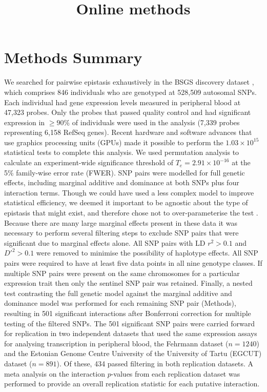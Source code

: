 \documentclass{article}
\title{Online methods}
\date{}
\author{}
\begin{document}
\maketitle


\tableofcontents

\section{Methods Summary}
We searched for pairwise epistasis exhaustively in the BSGS discovery dataset \cite{Powell2012}, which comprises 846 individuals who are genotyped at 528,509 autosomal SNPs. Each individual had gene expression levels measured in peripheral blood at 47,323 probes. Only the probes that passed quality control and had significant expression in $\geq 90\%$ of individuals were used in the analysis (7,339 probes representing 6,158 RefSeq genes). Recent hardware and software \cite{Hemani2011} advances that use graphics processing units (GPUs) made it possible to perform the $1.03 \times 10^{15}$ statistical tests to complete this analysis. We used permutation analysis \cite{Churchill1994a} to calculate an experiment-wide significance threshold of $T_{e} = 2.91 \times 10^{-16}$ at the 5\% family-wise error rate (FWER). SNP pairs were modelled for full genetic effects, including marginal additive and dominance at both SNPs plus four interaction terms. Though we could have used a less complex model to improve statistical efficiency, we deemed it important to be agnostic about the type of epistasis that might exist, and therefore chose not to over-parameterise the test \cite{Marchini2005, Hemani2013}. Because there are many large marginal effects present in these data it was necessary to perform several filtering steps to exclude SNP pairs that were significant due to marginal effects alone. All SNP pairs with LD $r^2 > 0.1$ and $D'^{2} > 0.1$ were removed to minimise the possibility of haplotype effects. All SNP pairs were required to have at least five data points in all nine genotype classes. If multiple SNP pairs were present on the same chromosomes for a particular expression trait then only the sentinel SNP pair was retained. Finally, a nested test contrasting the full genetic model against the marginal additive and dominance model was performed for each remaining SNP pair (Methods), resulting in 501 significant interactions after Bonferroni correction for multiple testing of the filtered SNPs. The 501 significant SNP pairs were carried forward for replication in two independent datasets that used the same expression assays for analysing transcription in peripheral blood, the Fehrmann dataset \cite{Fehrmann2011} ($n=1240$) and the Estonian Genome Centre University of the University of Tartu (EGCUT) dataset \cite{Metspalu2004} ($n=891$). Of these, 434 passed filtering in both replication datasets. A meta analysis on the interaction $p$-values from each replication dataset was performed to provide an overall replication statistic for each putative interaction.
\end{document}
